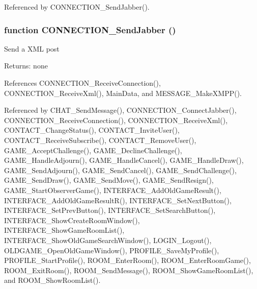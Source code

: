 Referenced by CONNECTION\_\-SendJabber().
\subsubsection{\setlength{\rightskip}{0pt plus 5cm}function CONNECTION\_\-SendJabber ()}\label{connection_8js_c49f7b7225ba663c90a59f9c2b7bff18}


Send a XML post

\begin{Desc}
\item[Returns:]none \end{Desc}


References CONNECTION\_\-ReceiveConnection(), CONNECTION\_\-ReceiveXml(), MainData, and MESSAGE\_\-MakeXMPP().

Referenced by CHAT\_\-SendMessage(), CONNECTION\_\-ConnectJabber(), CONNECTION\_\-ReceiveConnection(), CONNECTION\_\-ReceiveXml(), CONTACT\_\-ChangeStatus(), CONTACT\_\-InviteUser(), CONTACT\_\-ReceiveSubscribe(), CONTACT\_\-RemoveUser(), GAME\_\-AcceptChallenge(), GAME\_\-DeclineChallenge(), GAME\_\-HandleAdjourn(), GAME\_\-HandleCancel(), GAME\_\-HandleDraw(), GAME\_\-SendAdjourn(), GAME\_\-SendCancel(), GAME\_\-SendChallenge(), GAME\_\-SendDraw(), GAME\_\-SendMove(), GAME\_\-SendResign(), GAME\_\-StartObserverGame(), INTERFACE\_\-AddOldGameResult(), INTERFACE\_\-AddOldGameResultR(), INTERFACE\_\-SetNextButton(), INTERFACE\_\-SetPrevButton(), INTERFACE\_\-SetSearchButton(), INTERFACE\_\-ShowCreateRoomWindow(), INTERFACE\_\-ShowGameRoomList(), INTERFACE\_\-ShowOldGameSearchWindow(), LOGIN\_\-Logout(), OLDGAME\_\-OpenOldGameWindow(), PROFILE\_\-SaveMyProfile(), PROFILE\_\-StartProfile(), ROOM\_\-EnterRoom(), ROOM\_\-EnterRoomGame(), ROOM\_\-ExitRoom(), ROOM\_\-SendMessage(), ROOM\_\-ShowGameRoomList(), and ROOM\_\-ShowRoomList().